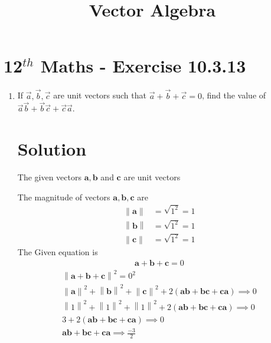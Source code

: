 \documentclass[12pt]{article}
\providecommand{\norm}[1]{\left\lVert#1\right\rVert}
\let\vec\mathbf
\begin{document}
\begin{center}
\title{\textbf{Vector Algebra}}
\date{\vspace{-5ex}} %
\maketitle
\end{center}
\setcounter{page}{1}
\section{12$^{th}$ Maths - Exercise 10.3.13}
\begin{enumerate}
\item If $\overrightarrow{a},\overrightarrow{b},\overrightarrow{c}$ are unit vectors such that $\overrightarrow{a}+\overrightarrow{b}+\overrightarrow{c}=0$, find the value of $\overrightarrow{a}\overrightarrow{b}+\overrightarrow{b}\overrightarrow{c}+\overrightarrow{c}\overrightarrow{a}$.  
\section{Solution}
The given vectors $\vec{a},\vec{b}$ and $\vec{c}$ are unit vectors
                
                The magnitude of vectors $\vec{a},\vec{b},\vec{c}$ are
        \begin{align}
\norm{\vec{a}} &=\sqrt{1^2}=1\\ \norm{\vec{b}}&=\sqrt{1^2}=1\\ \norm{\vec{c}}&=\sqrt{1^2}=1
        \end{align}
The Given equation is 
        \begin{align}
\vec{a}+\vec{b}+\vec{c}=0
\end{align}      
\begin{align}
\norm{\vec{a}+{\vec{b}}+{\vec{c}}}^2=0^2\\
\norm{\vec{a}}^2+\norm{\vec{b}}^2+\norm{\vec{c}}^2+2({\vec{a}}{\vec{b}}+{\vec{b}}{\vec{c}}+{\vec{c}}{\vec{a}})\implies0\\
\norm{1}^2+\norm{1}^2+\norm{1}^2+2({\vec{a}}{\vec{b}}+{\vec{b}}{\vec{c}}+{\vec{c}}{\vec{a}})\implies0\\
3+2({\vec{a}}{\vec{b}}+{\vec{b}}{\vec{c}}+{\vec{c}}{\vec{a}})\implies0\\
{\vec{a}}{\vec{b}}+{\vec{b}}{\vec{c}}+{\vec{c}}{\vec{a}}\implies\frac{-3}{2}
\end{align}
\end{enumerate}
\end{document}
